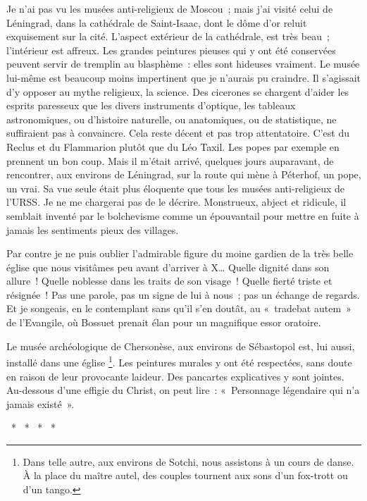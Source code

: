 \documentclass[french,twoside]{book} %
\begin{document}
\noindent Je n’ai pas vu les musées anti-religieux de Moscou ; mais j’ai visité celui de Léningrad, dans la cathédrale de Saint-Isaac, dont le dôme d’or reluit exquisement sur la cité. L’aspect extérieur de la cathédrale, est très beau ; l’intérieur est affreux. Les grandes peintures pieuses qui y ont été conservées peuvent servir de tremplin au blasphème : elles sont hideuses vraiment. Le musée lui-même est beaucoup moins impertinent que je n’aurais pu craindre. Il s’agissait d’y opposer au mythe religieux, la science. Des cicerones se chargent d’aider les esprits paresseux que les divers instruments d’optique, les tableaux astronomiques, ou d’histoire naturelle, ou anatomiques, ou de statistique, ne suffiraient pas à convaincre. Cela reste décent et pas trop attentatoire. C’est du Reclus et du Flammarion plutôt que du Léo Taxil. Les popes par exemple en prennent un bon coup. Mais il m’était arrivé, quelques jours auparavant, de rencontrer, aux environs de Léningrad, sur la route qui mène à Péterhof, un pope, un vrai. Sa vue seule était plus éloquente que tous les musées anti-religieux de l’URSS. Je ne me chargerai pas de le décrire. Monstrueux, abject et ridicule, il semblait inventé par le bolchevisme comme un épouvantail pour mettre en fuite à jamais les sentiments pieux des villages.\par
Par contre je ne puis oublier l’admirable figure du moine gardien de la très belle église que nous visitâmes peu avant d’arriver à X… Quelle dignité dans son allure ! Quelle noblesse dans les traits de son visage ! Quelle fierté triste et résignée ! Pas une parole, pas un signe de lui à nous ; pas un échange de regards. Et je songeais, en le contemplant sans qu’il s’en doutât, au « tradebat autem » de l’Evangile, où Bossuet prenait élan pour un magnifique essor oratoire.\par
Le musée archéologique de Chersonèse, aux environs de Sébastopol est, lui aussi, installé dans une église \footnote{Dans telle autre, aux environs de Sotchi, nous assistons à un cours de danse. À la place du maître autel, des couples tournent aux sons d’un fox-trott ou d’un tango.}. Les peintures murales y ont été respectées, sans doute en raison de leur provocante laideur. Des pancartes explicatives y sont jointes. Au-dessous d’une effigie du Christ, on peut lire : « Personnage légendaire qui n’a jamais existé ».\par
{\centering \noindent *  *  *  *  *\par}
\end{document}
